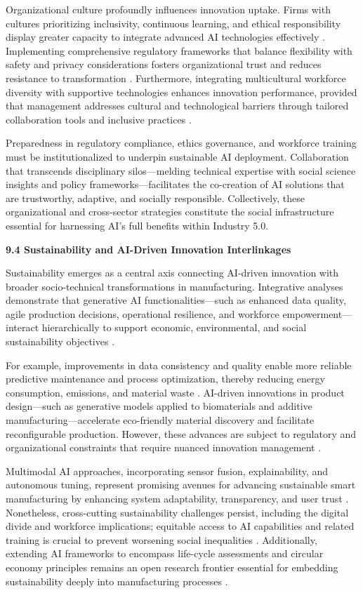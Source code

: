 \documentclass[11pt]{article}
\begin{document}
Organizational culture profoundly influences innovation uptake. Firms with cultures prioritizing inclusivity, continuous learning, and ethical responsibility display greater capacity to integrate advanced AI technologies effectively \cite{ref22,ref27}. Implementing comprehensive regulatory frameworks that balance flexibility with safety and privacy considerations fosters organizational trust and reduces resistance to transformation \cite{ref3}. Furthermore, integrating multicultural workforce diversity with supportive technologies enhances innovation performance, provided that management addresses cultural and technological barriers through tailored collaboration tools and inclusive practices \cite{ref24}.

Preparedness in regulatory compliance, ethics governance, and workforce training must be institutionalized to underpin sustainable AI deployment. Collaboration that transcends disciplinary silos—melding technical expertise with social science insights and policy frameworks—facilitates the co-creation of AI solutions that are trustworthy, adaptive, and socially responsible. Collectively, these organizational and cross-sector strategies constitute the social infrastructure essential for harnessing AI’s full benefits within Industry 5.0.

\textbf{9.4 Sustainability and AI-Driven Innovation Interlinkages}

Sustainability emerges as a central axis connecting AI-driven innovation with broader socio-technical transformations in manufacturing. Integrative analyses demonstrate that generative AI functionalities—such as enhanced data quality, agile production decisions, operational resilience, and workforce empowerment—interact hierarchically to support economic, environmental, and social sustainability objectives \cite{ref5}.

For example, improvements in data consistency and quality enable more reliable predictive maintenance and process optimization, thereby reducing energy consumption, emissions, and material waste \cite{ref11,ref36}. AI-driven innovations in product design—such as generative models applied to biomaterials and additive manufacturing—accelerate eco-friendly material discovery and facilitate reconfigurable production. However, these advances are subject to regulatory and organizational constraints that require nuanced innovation management \cite{ref14,ref21}.

Multimodal AI approaches, incorporating sensor fusion, explainability, and autonomous tuning, represent promising avenues for advancing sustainable smart manufacturing by enhancing system adaptability, transparency, and user trust \cite{ref5,ref30}. Nonetheless, cross-cutting sustainability challenges persist, including the digital divide and workforce implications; equitable access to AI capabilities and related training is crucial to prevent worsening social inequalities \cite{ref5}. Additionally, extending AI frameworks to encompass life-cycle assessments and circular economy principles remains an open research frontier essential for embedding sustainability deeply into manufacturing processes \cite{ref38}.
\end{document}
